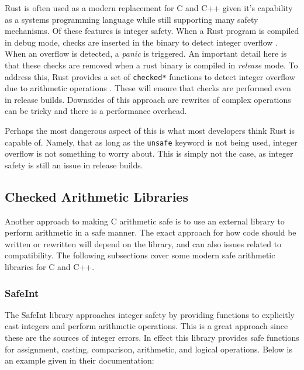 Rust is often used as a modern replacement for C and C++ given it's capability as a systems programming language while still supporting many safety mechanisms. Of these features is integer safety. When a Rust program is compiled in debug mode, checks are inserted in the binary to detect integer overflow \cite{rust_book}. When an overflow is detected, a \textit{panic} is triggered. An important detail here is that these checks are removed when a rust binary is compiled in \textit{release} mode. To address this, Rust provides a set of \texttt{checked*} functions to detect integer overflow due to arithmetic operations \cite{rust_checked}. These will ensure that checks are performed even in release builds. Downsides of this approach are rewrites of complex operations can be tricky and there is a performance overhead.

Perhaps the most dangerous aspect of this is what most developers think Rust is capable of. Namely, that as long as the \texttt{unsafe} keyword is not being used, integer overflow is not something to worry about. This is simply not the case, as integer safety is still an issue in release builds.

\subsection{Checked Arithmetic Libraries}

Another approach to making C arithmetic safe is to use an external library to perform arithmetic in a safe manner. The exact approach for how code should be written or rewritten will depend on the library, and can also issues related to compatibility. The following subsections cover some modern safe arithmetic libraries for C and C++.

\subsubsection{SafeInt}

The SafeInt library approaches integer safety by providing functions to explicitly cast integers and perform arithmetic operations. This is a great approach since these are the sources of integer errors. In effect this library provides safe functions for assignment, casting, comparison, arithmetic, and logical operations. Below is an example given in their documentation:

